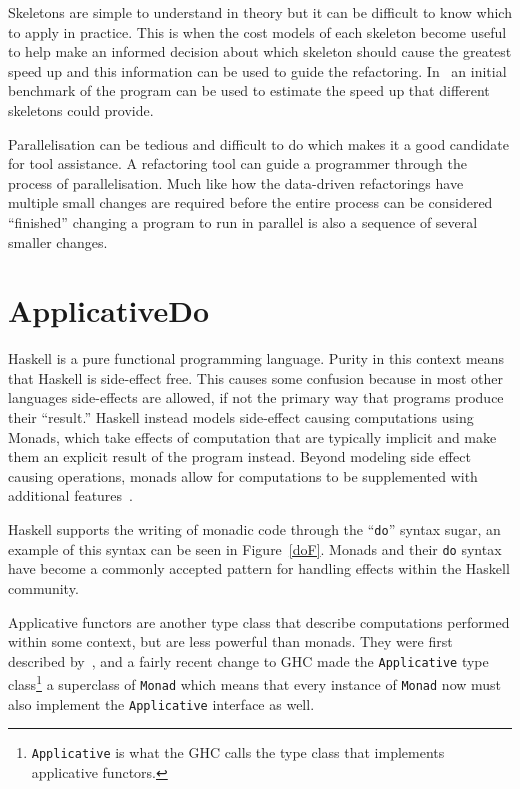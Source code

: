 Skeletons are simple to understand in theory but it can be difficult to know which to apply in practice. This is when the cost models of each skeleton become useful to help make an informed decision about which skeleton should cause the greatest speed up and this information can be used to guide the refactoring. In~\cite{parallelErl} an initial benchmark of the program can be used to estimate the speed up that different skeletons could provide.

Parallelisation can be tedious and difficult to do which makes it a good candidate for tool assistance. A refactoring tool can guide a programmer through the process of parallelisation. Much like how the data-driven refactorings have multiple small changes are required before the entire process can be considered ``finished'' changing a program to run in parallel is also a sequence of several smaller changes.

\section{ApplicativeDo}\label{applicativeDo}

Haskell is a pure functional programming language. Purity in this context means that Haskell is side-effect free. This causes some confusion because in most other languages side-effects are allowed, if not the primary way that programs produce their ``result.'' Haskell instead models side-effect causing computations using Monads, which take effects of computation that are typically implicit and make them an explicit result of the program instead. Beyond modeling side effect causing operations, monads allow for computations to be supplemented with additional features~\citep{haskellWikiMonad}.

Haskell supports the writing of monadic code through the ``\texttt{do}'' syntax sugar, an example of this syntax can be seen in Figure~\ref{doF}. Monads and their \texttt{do} syntax have become a commonly accepted pattern for handling effects within the Haskell community. 

Applicative functors are another type class that describe computations performed within some context, but are less powerful than monads. They were first described by~\cite{mcbrideIdioms}, and a fairly recent change to GHC made the \texttt{Applicative} type class\footnote{\texttt{Applicative} is what the GHC calls the type class that implements applicative functors.} a superclass of \texttt{Monad} which means that every instance of \texttt{Monad} now must also implement the \texttt{Applicative} interface as well.   

